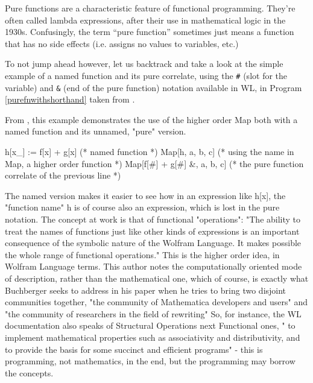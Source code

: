 \begin{displayquote}
Pure functions are a characteristic feature of functional programming. They’re often called lambda expressions, after their use in mathematical logic in the 1930s. Confusingly, the term “pure function” sometimes just means a function that has no side effects (i.e. assigns no values to variables, etc.)
\cite[First note in Tech Notes]{noauthor_pure_nodate}
\end{displayquote}

To not jump ahead however, let us backtrack and take a look at the simple example of a named function and its pure correlate, using the \lstinline+#+ (slot for the variable) and \lstinline+&+ (end of the pure function) notation available in WL, in Program \ref{purefnwithshorthand} taken from \cite{noauthor_functional_nodate}.

\begin{program}
\caption{From \cite{noauthor_functional_nodate}, this example demonstrates the use of the higher order Map \cite{noauthor_map_nodate} both with a named function and its unnamed, "pure" version.}
\label{purefnwithshorthand}
\begin{LaTeXCode}
h[x_] := f[x] + g[x] (* named function *)
Map[h, {a, b, c}] (* using the name in Map, a higher order function *)
Map[f[#] + g[#] &, {a, b, c}] (* the pure function correlate of the previous line *)
\end{LaTeXCode}
\end{program}

The named version makes it easier to see how in an expression like h[x], the "function name" h is of course also an expression, which is lost in the pure notation. The concept at work is that of functional "operations": "The ability to treat the names of functions just like other kinds of expressions is an important consequence of the symbolic nature of the Wolfram Language. It makes possible the whole range of functional operations." \cite{noauthor_functional_nodate} This is the higher order idea, in Wolfram Language terms. This author notes the computationally oriented mode of description, rather than the mathematical one, which of course, is exactly what Buchberger seeks to address in his paper when he tries to bring two disjoint communities together, "the community of Mathematica developers and users" and "the community of researchers in the field of rewriting" \cite[p. 1]{buchberger_mathematica_1996} So, for instance, the WL documentation also speaks of Structural Operations next Functional ones, " to implement mathematical properties such as associativity and distributivity, and to provide the basis for some succinct and efficient programs" \cite{noauthor_functional_nodate} - this is programming, not mathematics, in the end, but the programming may borrow the concepts.

